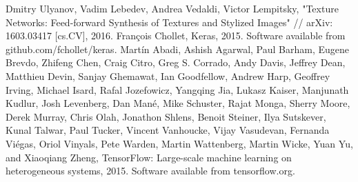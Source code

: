\documentclass[a4paper]{article}
\begin{document}
\begin{thebibliography}{99}
		 Dmitry Ulyanov, Vadim Lebedev, Andrea Vedaldi, Victor Lempitsky, "Texture Networks: Feed-forward Synthesis of Textures and Stylized Images" // arXiv: 1603.03417 [cs.CV], 2016.
		 François Chollet, Keras, 2015. Software available from github.com/fchollet/keras.
		 Martín Abadi, Ashish Agarwal, Paul Barham, Eugene Brevdo,
		Zhifeng Chen, Craig Citro, Greg S. Corrado, Andy Davis,
		Jeffrey Dean, Matthieu Devin, Sanjay Ghemawat, Ian Goodfellow,
		Andrew Harp, Geoffrey Irving, Michael Isard, Rafal Jozefowicz, Yangqing Jia,
		Lukasz Kaiser, Manjunath Kudlur, Josh Levenberg, Dan Mané, Mike Schuster,
		Rajat Monga, Sherry Moore, Derek Murray, Chris Olah, Jonathon Shlens,
		Benoit Steiner, Ilya Sutskever, Kunal Talwar, Paul Tucker,
		Vincent Vanhoucke, Vijay Vasudevan, Fernanda Viégas,
		Oriol Vinyals, Pete Warden, Martin Wattenberg, Martin Wicke,
		Yuan Yu, and Xiaoqiang Zheng,
		TensorFlow: Large-scale machine learning on heterogeneous systems,
		2015. Software available from tensorflow.org.
	\end{thebibliography}
	
\end{document}
